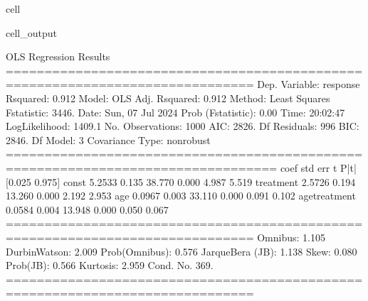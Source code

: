 \documentclass[letterpaper,10pt,english]{jupyterBook}
\begin{document}
\begin{sphinxuseclass}{cell}
\begin{sphinxVerbatimOutput}
\begin{sphinxuseclass}{cell_output}
\begin{sphinxVerbatim}[commandchars=\\\{\}]
                            OLS Regression Results                            
==============================================================================
Dep. Variable:               response   R\PYGZhy{}squared:                       0.912
Model:                            OLS   Adj. R\PYGZhy{}squared:                  0.912
Method:                 Least Squares   F\PYGZhy{}statistic:                     3446.
Date:                Sun, 07 Jul 2024   Prob (F\PYGZhy{}statistic):               0.00
Time:                        20:02:47   Log\PYGZhy{}Likelihood:                \PYGZhy{}1409.1
No. Observations:                1000   AIC:                             2826.
Df Residuals:                     996   BIC:                             2846.
Df Model:                           3                                         
Covariance Type:            nonrobust                                         
=================================================================================
                    coef    std err          t      P\PYGZgt{}|t|      [0.025      0.975]
\PYGZhy{}\PYGZhy{}\PYGZhy{}\PYGZhy{}\PYGZhy{}\PYGZhy{}\PYGZhy{}\PYGZhy{}\PYGZhy{}\PYGZhy{}\PYGZhy{}\PYGZhy{}\PYGZhy{}\PYGZhy{}\PYGZhy{}\PYGZhy{}\PYGZhy{}\PYGZhy{}\PYGZhy{}\PYGZhy{}\PYGZhy{}\PYGZhy{}\PYGZhy{}\PYGZhy{}\PYGZhy{}\PYGZhy{}\PYGZhy{}\PYGZhy{}\PYGZhy{}\PYGZhy{}\PYGZhy{}\PYGZhy{}\PYGZhy{}\PYGZhy{}\PYGZhy{}\PYGZhy{}\PYGZhy{}\PYGZhy{}\PYGZhy{}\PYGZhy{}\PYGZhy{}\PYGZhy{}\PYGZhy{}\PYGZhy{}\PYGZhy{}\PYGZhy{}\PYGZhy{}\PYGZhy{}\PYGZhy{}\PYGZhy{}\PYGZhy{}\PYGZhy{}\PYGZhy{}\PYGZhy{}\PYGZhy{}\PYGZhy{}\PYGZhy{}\PYGZhy{}\PYGZhy{}\PYGZhy{}\PYGZhy{}\PYGZhy{}\PYGZhy{}\PYGZhy{}\PYGZhy{}\PYGZhy{}\PYGZhy{}\PYGZhy{}\PYGZhy{}\PYGZhy{}\PYGZhy{}\PYGZhy{}\PYGZhy{}\PYGZhy{}\PYGZhy{}\PYGZhy{}\PYGZhy{}\PYGZhy{}\PYGZhy{}\PYGZhy{}\PYGZhy{}
const             5.2533      0.135     38.770      0.000       4.987       5.519
treatment         2.5726      0.194     13.260      0.000       2.192       2.953
age               0.0967      0.003     33.110      0.000       0.091       0.102
age\PYGZus{}treatment     0.0584      0.004     13.948      0.000       0.050       0.067
==============================================================================
Omnibus:                        1.105   Durbin\PYGZhy{}Watson:                   2.009
Prob(Omnibus):                  0.576   Jarque\PYGZhy{}Bera (JB):                1.138
Skew:                          \PYGZhy{}0.080   Prob(JB):                        0.566
Kurtosis:                       2.959   Cond. No.                         369.
==============================================================================


\end{sphinxVerbatim}
\end{sphinxuseclass}
\end{sphinxVerbatimOutput}
\end{sphinxuseclass}
\end{document}
